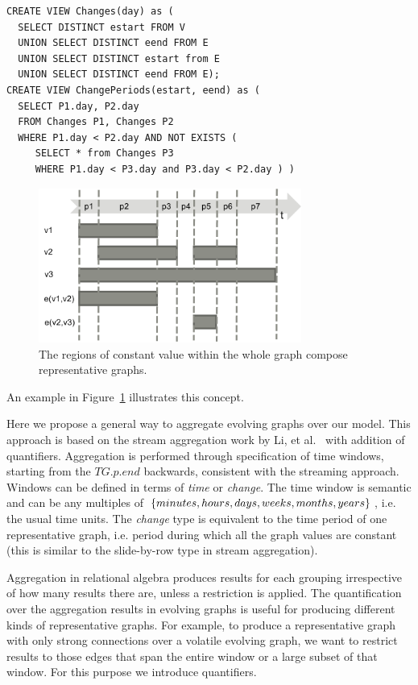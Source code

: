 \begin{small}
\begin{verbatim}
CREATE VIEW Changes(day) as (
  SELECT DISTINCT estart FROM V
  UNION SELECT DISTINCT eend FROM E
  UNION SELECT DISTINCT estart from E
  UNION SELECT DISTINCT eend FROM E);
CREATE VIEW ChangePeriods(estart, eend) as (
  SELECT P1.day, P2.day
  FROM Changes P1, Changes P2
  WHERE P1.day < P2.day AND NOT EXISTS (
     SELECT * from Changes P3
     WHERE P1.day < P3.day and P3.day < P2.day ) )
\end{verbatim}
\end{small}

\begin{figure}
\centering
\includegraphics[width=3.4in]{figs/change_timeline.pdf}
\caption{The regions of constant value within the whole graph compose
  representative graphs.}
\label{fig:changes}
\end{figure}

An example in Figure~\ref{fig:changes} illustrates this concept.

Here we propose a general way to aggregate evolving graphs over our
model.  This approach is based on the stream aggregation work by Li,
et al.~\cite{Li2005} with addition of quantifiers.  Aggregation is
performed through specification of time windows, starting from the
$TG.p.end$ backwards, consistent with the streaming approach.  Windows
can be defined in terms of {\em time} or {\em change}.  The time
window is semantic and can be any multiples of $\{minutes, hours,
days, weeks, \\ months, years\}$, i.e. the usual time units.  The {\em
  change} type is equivalent to the time period of one representative
graph, i.e. period during which all the graph values are constant
(this is similar to the slide-by-row type in stream aggregation).

Aggregation in relational algebra produces results for each grouping
irrespective of how many results there are, unless a 
restriction is applied.  The quantification over the aggregation
results in evolving graphs is useful for producing different kinds of
representative graphs.  For example, to produce a representative graph
with only strong connections over a volatile evolving graph, we want
to restrict results to those edges that span the entire window or a
large subset of that window.  For this purpose we introduce
quantifiers.

